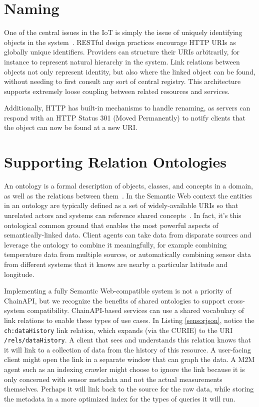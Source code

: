 \documentclass{acm_proc_article-sp}
\begin{document}
\section{Naming}

One of the central issues in the IoT is simply the issue of uniquely
identifying objects in the system~\cite{iotsurvey}. RESTful design practices
encourage HTTP URIs as globally unique identifiers. Providers can structure
their URIs arbitrarily, for instance to represent natural hierarchy in the
system. Link relations between objects not only represent identity, but also
where the linked object can be found, without needing to first consult any sort
of central registry. This architecture supports extremely loose coupling
between related resources and services.

Additionally, HTTP has built-in mechanisms to handle renaming, as servers can
respond with an HTTP Status 301 (Moved Permanently) to notify clients that the
object can now be found at a new URI.

\section{Supporting Relation Ontologies}

An ontology is a formal description of objects, classes, and concepts in a
domain, as well as the relations between them~\cite{gruber1993}. In the
Semantic Web context the entities in an ontology are typically defined as a set
of widely-available URIs so that unrelated actors and systems can reference
shared concepts~\cite{bernerslee2001semantic}. In fact, it's this ontological
common ground that enables the most powerful aspects of semantically-linked
data. Client agents can take data from disparate sources and leverage the
ontology to combine it meaningfully, for example combining temperature data
from multiple sources, or automatically combining sensor data from different
systems that it knows are nearby a particular latitude and longitude.

Implementing a fully Semantic Web-compatible system is not a priority of
ChainAPI, but we recognize the benefits of shared ontologies to support
cross-system compatibility. ChainAPI-based services can use a shared vocabulary
of link relations to enable these types of use cases. In Listing
\ref{sensorjson}, notice the \texttt{ch:dataHistory} link relation, which
expands (via the CURIE) to the URI \texttt{/rels/dataHistory}. A client that
sees and understands this relation knows that it will link to a collection of
data from the history of this resource. A user-facing client might open the
link in a separate window that can graph the data. A M2M agent such as an
indexing crawler might choose to ignore the link because it is only concerned
with sensor metadata and not the actual measurements themselves. Perhaps it
will link back to the source for the raw data, while storing the metadata in a
more optimized index for the types of queries it will run.
\end{document}
